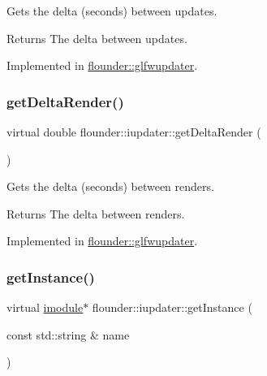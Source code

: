 Gets the delta (seconds) between updates. 

\begin{DoxyReturn}{Returns}
The delta between updates. 
\end{DoxyReturn}


Implemented in \hyperlink{classflounder_1_1glfwupdater_a8da4916f3335126413a072203b94a735}{flounder\+::glfwupdater}.

\mbox{\label{classflounder_1_1iupdater_a00d7cf530cfbd7f83c8903328da14027}} 
\subsubsection{\texorpdfstring{get\+Delta\+Render()}{getDeltaRender()}}
{\footnotesize\ttfamily virtual double flounder\+::iupdater\+::get\+Delta\+Render (\begin{DoxyParamCaption}{ }\end{DoxyParamCaption})\hspace{0.3cm}{\ttfamily [pure virtual]}}



Gets the delta (seconds) between renders. 

\begin{DoxyReturn}{Returns}
The delta between renders. 
\end{DoxyReturn}


Implemented in \hyperlink{classflounder_1_1glfwupdater_a3f8d8a108c8db0d2ead35088646687c9}{flounder\+::glfwupdater}.

\mbox{\label{classflounder_1_1iupdater_a391b1788b5c139b199ed48033da1b88d}} 
\subsubsection{\texorpdfstring{get\+Instance()}{getInstance()}}
{\footnotesize\ttfamily virtual \hyperlink{classflounder_1_1imodule}{imodule}$\ast$ flounder\+::iupdater\+::get\+Instance (\begin{DoxyParamCaption}\item[{const std\+::string \&}]{name }\end{DoxyParamCaption})\hspace{0.3cm}{\ttfamily [pure virtual]}}



